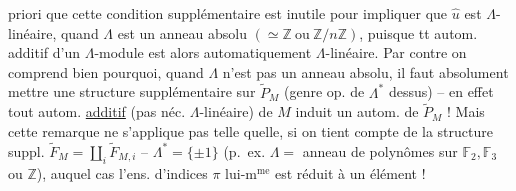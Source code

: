priori que cette condition supplémentaire
est inutile pour impliquer que $\widehat u$ est
$\Lambda$-linéaire, quand $\Lambda$ est un anneau
absolu $(\simeq\mathbb Z\ \text{ou}\ \mathbb Z/n\mathbb Z)$, puisque tt
autom. additif d'un $\Lambda$-module est
alors automatiquement $\Lambda$-linéaire. Par
contre on comprend bien pourquoi,
quand $\Lambda$ n'est pas un anneau absolu,
il faut absolument mettre une structure
supplémentaire sur $\widetilde P_M$  (genre op. de $\Lambda^*$
dessus) -- en effet tout autom. \uline{additif}
(pas néc. $\Lambda$-linéaire) de $M$ induit un
autom. de $\widetilde P_M$ ! Mais cette remarque
ne s'applique pas telle quelle, si on
tient compte de la structure suppl.
$\widetilde F_M=\coprod_i\widetilde F_{M,i}$ --   $\Lambda^*=\{\pm1\}$
(p.~ex. $\Lambda=$  anneau de polynômes sur
$\mathbb F_2,\mathbb F_3$ ou $\mathbb Z$), auquel cas l'ens. d'indices
$\pi$ lui-m$^{\text{me}}$ est réduit à un élément !
